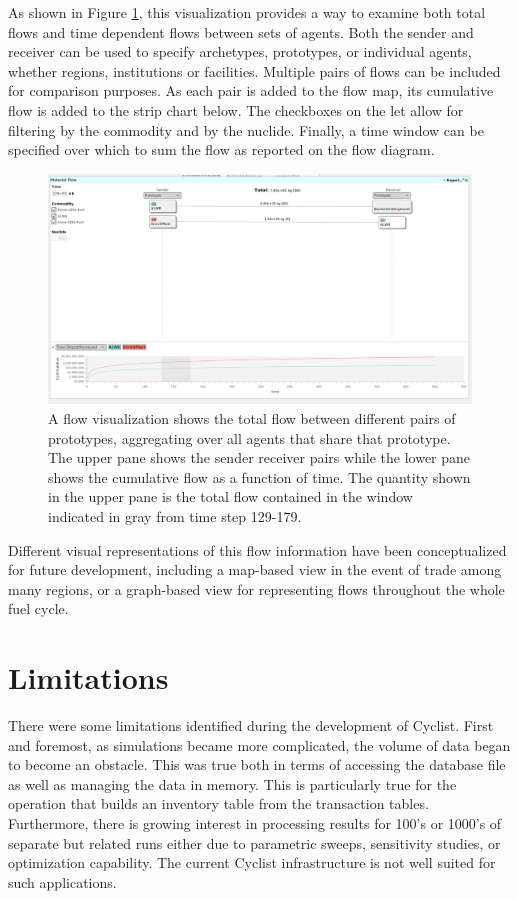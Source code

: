 As shown in Figure \ref{fig:flow-01-05}, this visualization provides a way to
examine both total flows and time dependent flows between sets of agents.
Both the sender and receiver can be used to specify archetypes, prototypes, or
individual agents, whether regions, institutions or facilities.  Multiple
pairs of flows can be included for comparison purposes.  As each pair is added
to the flow map, its cumulative flow is added to the strip chart below.  The
checkboxes on the let allow for filtering by the commodity and by the nuclide.
Finally, a time window can be specified over which to sum the flow as reported
on the flow diagram.

\begin{figure}[htbp]
  \centering
  \includegraphics[width=\columnwidth]{./images/flow-01-05}
  \caption{A flow visualization shows the total flow between different pairs of
    prototypes, aggregating over all agents that share that prototype.  The
    upper pane shows the sender receiver pairs while the lower pane shows the
    cumulative flow as a function of time.  The quantity shown in the upper
    pane is the total flow contained in the window indicated in gray from time
    step 129-179. }
  \label{fig:flow-01-05}
\end{figure}

Different visual representations of this flow information have been
conceptualized for future development, including a map-based view in the event
of trade among many regions, or a graph-based view for representing flows
throughout the whole fuel cycle.

\section{Limitations}

There were some limitations identified during the development of Cyclist.
First and foremost, as \Cyclus simulations became more complicated, the volume
of data began to become an obstacle.  This was true both in terms of accessing
the database file as well as managing the data in memory.  This is
particularly true for the operation that builds an inventory table from the
transaction tables.  Furthermore, there is growing interest in processing
results for 100's or 1000's of separate but related \Cyclus runs either due to
parametric sweeps, sensitivity studies, or optimization capability.  The
current Cyclist infrastructure is not well suited for such applications.

